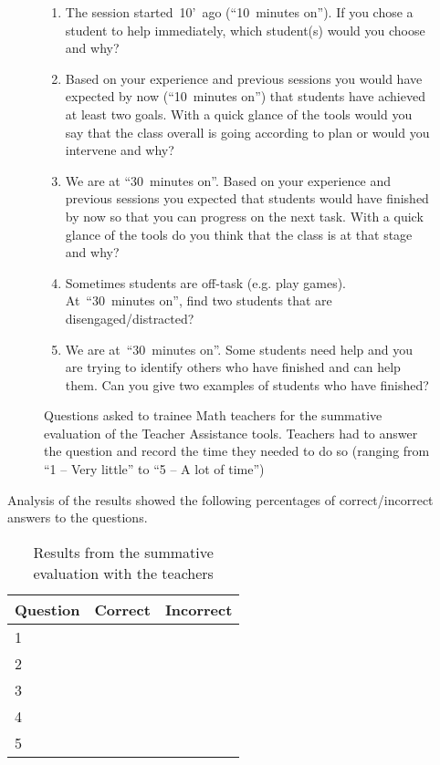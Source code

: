 \begin{figure}[tb]
  \centering
  \begin{framed}
  \begin{enumerate}
  \item The session started~10’~ago (“10~minutes on”). If you chose a
    student to help immediately, which student(s) would you choose and
    why?
  \item Based on your experience and previous sessions you would have
    expected by now (“10~minutes on”) that students have achieved at
    least two goals. With a quick glance of the tools would you say
    that the class overall is going according to plan or would you
    intervene and why?
  \item We are at “30~minutes on”. Based on your experience and
    previous sessions you expected that students would have finished
    by now so that you can progress on the next task. With a quick
    glance of the tools do you think that the class is at that stage
    and why?
  \item Sometimes students are off-task (e.g. play
    games). At~“30~minutes on”, find two students that are
    disengaged/distracted?
  \item We are at~“30~minutes on”. Some students need help and you are
    trying to identify others who have finished and can help them. Can
    you give two examples of students who have finished? 
  \end{enumerate}    
  \end{framed}
  \vspace{-1em}
  \caption{Questions asked to trainee Math teachers for the summative
    evaluation of the Teacher Assistance tools. Teachers had to answer
    the question and record the time they needed to do so (ranging
    from ``1 -- Very little'' to ``5 -- A lot of time'')} 
  \label{fig:questions-pgce}
\end{figure}

Analysis of the results showed the following percentages of
correct/incorrect answers to the questions. 

\begin{table}[htbp]
  \centering
  \begin{tabular}{|p{2cm}|p{5cm}|p{5cm}|}
    \hline
    Question & Correct & Incorrect \\
    \hline
    1 & & \\
    \hline
    2 & & \\
    \hline
    3 & & \\
    \hline
    4 & & \\
    \hline
    5 & & \\
    \hline    
  \end{tabular}
  \caption{Results from the summative evaluation with the teachers}
  \label{tab:results-pgce}
\end{table}

